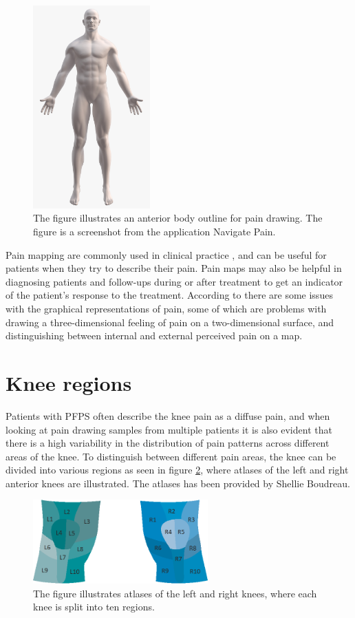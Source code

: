 \begin{figure} [H]
\centering
\includegraphics[width=0.4\textwidth]{figures/painmap}
\caption{The figure illustrates an anterior body outline for pain drawing. The figure is a screenshot from the application Navigate Pain.}
\label{fig:painmap}
\end{figure}

\noindent
Pain mapping are commonly used in clinical practice \citep{Schott2010}, and can be useful for patients when they try to describe their pain. Pain maps may also be helpful in diagnosing patients and follow-ups during or after treatment to get an indicator of the patient’s response to the treatment.\citep{Boudreau2016}
According to \citeauthor{Schott2010} there are some issues with the graphical representations of pain, some of which are problems with drawing a three-dimensional feeling of pain on a two-dimensional surface, and distinguishing between internal and external perceived pain on a map.\citep{Schott2010}

\section{Knee regions}
Patients with PFPS often describe the knee pain as a diffuse pain, and when looking at pain drawing samples from multiple patients it is also evident that there is a high variability in the distribution of pain patterns across different areas of the knee. 
To distinguish between different pain areas, the knee can be divided into various regions as seen in figure \ref{fig:atlas}, where atlases of the left and right anterior knees are illustrated. The atlases has been provided by Shellie Boudreau. 

\begin{figure} [H]
\centering
\includegraphics[width=0.6\textwidth]{figures/atlas}
\caption{The figure illustrates atlases of the left and right knees, where each knee is split into ten regions.}
\label{fig:atlas}
\end{figure}

\newpage